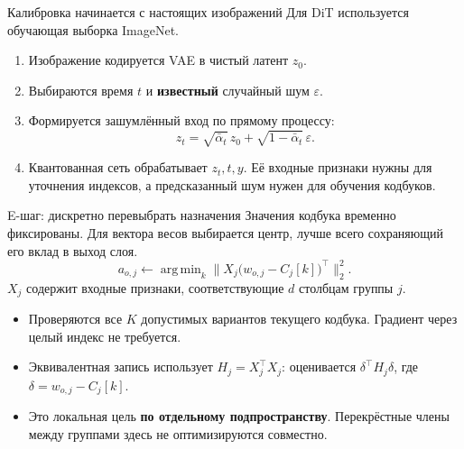 \documentclass[aspectratio=169,10pt]{beamer}
\newcommand{\takeaway}[1]{\par\vspace{1.5mm}{\bfseries #1\par}}
\newcommand{\tights}{\setlength{\itemsep}{1.4mm}\setlength{\parsep}{0pt}\setlength{\parskip}{0pt}}
\DeclareMathOperator{\argmin}{arg\,min}
\begin{document}
\begin{frame}[t]{Калибровка начинается с настоящих изображений}
  Для DiT используется обучающая выборка ImageNet.
  \begin{enumerate}\tights
    \item Изображение кодируется VAE в чистый латент $z_0$.
    \item Выбираются время $t$ и \textbf{известный} случайный шум $\varepsilon$.
    \item Формируется зашумлённый вход по прямому процессу:
    \[
      z_t=\sqrt{\bar\alpha_t}\,z_0+
          \sqrt{1-\bar\alpha_t}\,\varepsilon.
    \]
    \item Квантованная сеть обрабатывает $z_t,t,y$.
    Её входные признаки нужны для уточнения индексов,
    а предсказанный шум нужен для обучения кодбуков.
  \end{enumerate}
  \takeaway{Для одного обновления не требуется проходить всю генерацию.\par
  Разные времена покрываются новыми обучающими примерами.}
\end{frame}

\begin{frame}[t]{E-шаг: дискретно перевыбрать назначения}
  Значения кодбука временно фиксированы. Для вектора весов выбирается центр,
  лучше всего сохраняющий его вклад в выход слоя.
  \[
    a_{o,j}\leftarrow\argmin_k
      \bigl\|X_j\bigl(w_{o,j}-C_j[k]\bigr)^\top\bigr\|_2^2.
  \]
  $X_j$ содержит входные признаки, соответствующие $d$ столбцам группы $j$.
  \begin{itemize}\tights
    \item Проверяются все $K$ допустимых вариантов текущего кодбука.
    Градиент через целый индекс не требуется.
    \item Эквивалентная запись использует $H_j=X_j^\top X_j$:
    оценивается $\delta^\top H_j\delta$, где $\delta=w_{o,j}-C_j[k]$.
    \item Это локальная цель \textbf{по отдельному подпространству}.
    Перекрёстные члены между группами здесь не оптимизируются совместно.
  \end{itemize}
  \takeaway{Ближайший центр по весам может оказаться не лучшим\par
  по выходу слоя: важны реально поступающие активации.}
\end{frame}
\end{document}
